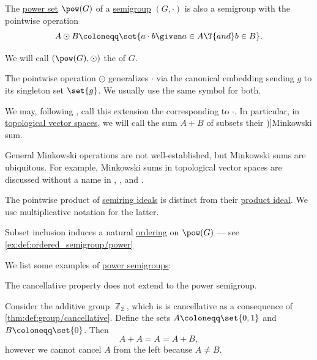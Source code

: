 \begin{definition}\label{def:power_semigroup}
  The \hyperref[def:power_set]{power set} \( \pow(G) \) of a \hyperref[def:semigroup]{semigroup} \( (G, \cdot) \) is also a semigroup with the pointwise operation
  \begin{equation*}
    A \odot B \coloneqq \set{ a \cdot b \given a \in A \T{and} b \in B }.
  \end{equation*}

  We will call \( (\pow(G), \odot) \) the  of \( G \).

  The pointwise operation \( \odot \) generalizes \( \cdot \) via the canonical embedding sending \( g \) to its singleton set \( \set{ g } \). We usually use the same symbol for both.

  We may, following \textcite[3]{Stewart1998MatrixAlgorithmsVol1}, call this extension the  corresponding to \( \cdot \). In particular, in \hyperref[def:topological_vector_space]{topological vector spaces}, we will call the sum \( A + B \) of subsets their \term[en=Minkowski sum (\cite[\S 11.1.3]{Berger1987GeometryI})]{Minkowski sum}.
\end{definition}
\begin{comments}
  \item General Minkowski operations are not well-established, but Minkowski sums are ubiquitous. For example, Minkowski sums in topological vector spaces are discussed without a name in
  \cite[6]{Rudin1991FunctionalAnalysis},
  \cite[4]{Rockafellar1997ConvexAnalysis},
  \cite[4]{Clarke2013OptimalControl} and
  \cite[25]{МагарилИльяевТихомиров2002ВыпуклыйАнализ}.

  \item The pointwise product of \hyperref[def:semiring_ideal]{semiring ideals} is distinct from their \hyperref[def:semiring_ideal/product]{product ideal}. We use multiplicative notation for the latter.

  \item Subset inclusion induces a natural \hyperref[def:ordered_semigroup]{ordering} on \( \pow(G) \) --- see \cref{ex:def:ordered_semigroup/power}
\end{comments}

\begin{example}\label{ex:def:power_semigroup}
  We list some examples of \hyperref[def:power_semigroup]{power semigroups}:
  \begin{thmenum}
     The cancellative property does not extend to the power semigroup.

    Consider the additive group \hyperref[def:group_of_integers_modulo]{\( \BbbZ_2 \)}, which is is cancellative as a consequence of \cref{thm:def:group/cancellative}. Define the sets \( A \coloneqq \set{ 0, 1 } \) and \( B \coloneqq \set{ 0 } \). Then
    \begin{equation*}
      A + A = A = A + B,
    \end{equation*}
    however we cannot cancel \( A \) from the left because \( A \neq B \).
  \end{thmenum}
\end{example}


